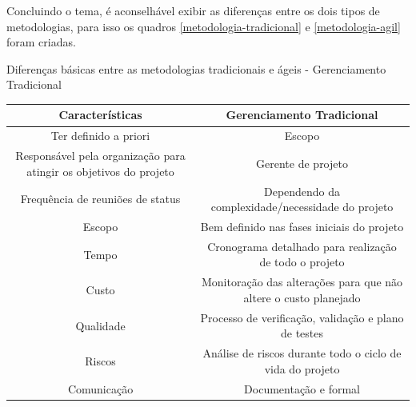 Concluindo o tema, é aconselhável exibir as diferenças entre os dois tipos de metodologias, para isso os quadros \ref{metodologia-tradicional} e \ref{metodologia-agil} foram criadas. 
\newpage

\begin{quadro}[h]
\centering
{}
\caption{Diferenças básicas entre as metodologias tradicionais e ágeis - Gerenciamento Tradicional}
\vspace{0.5cm}
\begin{tabular}{c|c}
 
\textbf{Características} & \textbf{Gerenciamento Tradicional} \\ %
\hline                               %
Ter definido a priori & Escopo \\
Responsável pela organização para atingir os objetivos do projeto & Gerente de projeto \\
Frequência de reuniões de status & Dependendo da complexidade/necessidade do projeto \\
Escopo & Bem definido nas fases iniciais do projeto \\
Tempo & Cronograma detalhado para realização de todo o projeto \\          %
Custo & Monitoração das alterações para que não altere o custo planejado \\
Qualidade & Processo de verificação, validação e plano de testes \\
Riscos & Análise de riscos durante todo o ciclo de vida do projeto \\
Comunicação & Documentação e formal \\
\hline
\end{tabular}
\label{metodologia-tradicional}
\end{quadro}

\hspace{1.5cm}

